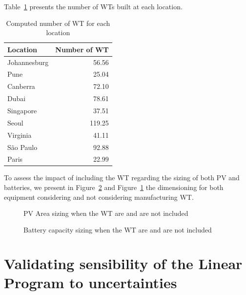 Table~\ref{tab:results_wt} presents the number of WTs  built at each location. 

\begin{table}[H]
  
  \caption{Computed number of WT for each location}\label{tab:results_wt} \centering

  \begin{tabular}{|l|r|}
   \hline
    
  \textbf{Location} &   \textbf{Number of WT} \\
  \hline
  Johannesburg & 56.56   \\
  \hline
  Pune  & 25.04 \\
  \hline
  Canberra  & 72.10 \\
  \hline
  Dubai   &  78.61  \\
  \hline
  Singapore & 37.51  \\
  \hline     
  Seoul    & 119.25  \\
  \hline
  Virginia   & 41.11 \\
  \hline
  São Paulo   & 92.88 \\
  \hline 
  Paris    &    22.99 \\
  \hline
    
\end{tabular}  
\end{table}


To assess the impact of including the WT regarding the sizing of both PV and batteries, we present in Figure~\ref{fig:wind_bat} and Figure~\ref{fig:wind_pv}  the dimensioning for both equipment considering and not considering manufacturing WT. 

\begin{figure}[H]
  \centering
  {}
  \caption{PV Area sizing when the WT are and are not included }
  \label{fig:wind_pv}
\end{figure}


\begin{figure}[H]
  \centering
  {}
  \caption{Battery capacity sizing when the WT are and are not included }
  \label{fig:wind_bat}
\end{figure}

\section{Validating sensibility of the Linear Program to  uncertainties}

